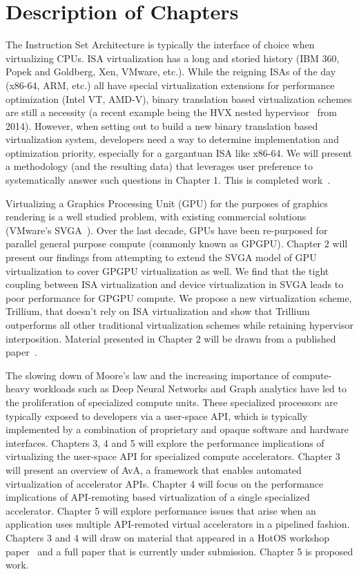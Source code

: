 \section{Description of Chapters}
\label{sec:chapters}

The Instruction Set Architecture is typically the interface of choice when virtualizing CPUs. ISA virtualization has a long and storied history (IBM 360, Popek and Goldberg, Xen, VMware, etc.). While the reigning ISAs of the day (x86-64, ARM, etc.) all have special virtualization extensions for performance optimization (Intel VT, AMD-V), binary translation based virtualization schemes are still a necessity (a recent example being the HVX nested hypervisor~\cite{HVX} from 2014). However, when setting out to build a new binary translation based virtualization system, developers need a way to determine implementation and optimization priority, especially for a gargantuan ISA like x86-64. We will present a methodology (and the resulting data) that leverages user preference to systematically answer such questions in Chapter 1. This is completed work~\cite{x86-systor}.

Virtualizing a Graphics Processing Unit (GPU) for the purposes of graphics rendering is a well studied problem, with existing commercial solutions (VMware’s SVGA~\cite{dowty2009gpu}). Over the last decade, GPUs have been re-purposed for parallel general purpose compute (commonly known as GPGPU). Chapter 2 will present our findings from attempting to extend the SVGA model of GPU virtualization to cover GPGPU virtualization as well. We find that the tight coupling between ISA virtualization and device virtualization in SVGA leads to poor performance for GPGPU compute. We propose a new virtualization scheme, Trillium, that doesn’t rely on ISA virtualization and show that Trillium outperforms all other traditional virtualization schemes while retaining hypervisor interposition. Material presented in Chapter 2 will be drawn from a published paper~\cite{trillium}.

The slowing down of Moore’s law and the increasing importance of compute-heavy workloads such as Deep Neural Networks and Graph analytics have led to the proliferation of specialized compute units. These specialized processors are typically exposed to developers via a user-space API, which is typically implemented by a combination of proprietary and opaque software and hardware interfaces. Chapters 3, 4 and 5 will explore the performance implications of virtualizing the user-space API for specialized compute accelerators. Chapter 3 will present an overview of AvA, a framework that enables automated virtualization of accelerator APIs. Chapter 4 will focus on the performance implications of API-remoting based virtualization of a single specialized accelerator. Chapter 5 will explore performance issues that arise when an application uses multiple API-remoted virtual accelerators in a pipelined fashion. Chapters 3 and 4 will draw on material that appeared in a HotOS workshop paper~\cite{ava-hotos} and a full paper that is currently under submission. Chapter 5 is proposed work.

